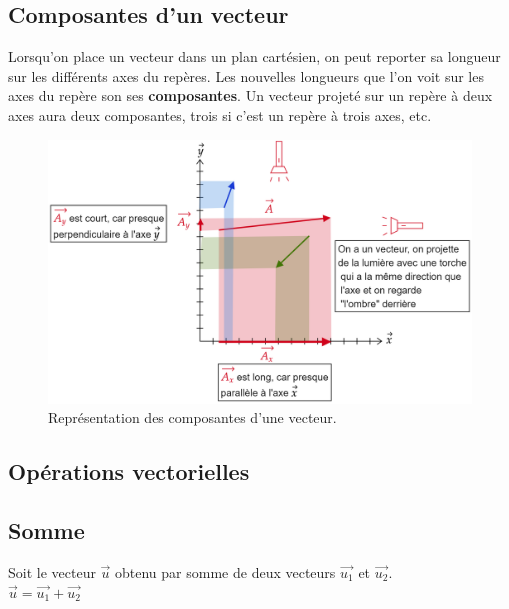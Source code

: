 \documentclass[
	11pt, %
	fleqn, %
	a4paper, %
]{LegrandOrangeBook}
\begin{document}
\subsection{Composantes d'un vecteur}


\begin{theorem}
Lorsqu’on place un vecteur dans un plan cartésien, on peut reporter sa longueur sur les différents axes du repères. Les nouvelles longueurs que l'on voit sur les axes du repère son ses \textbf{composantes}. Un vecteur projeté sur un repère à deux axes aura deux composantes, trois si c'est un repère à trois axes, etc.
\end{theorem}

\begin{figure}[H] %
	\centering %
	\includegraphics[width=1\textwidth]{Images/compo1.png} %
	\caption{Représentation des composantes d'une vecteur.}
	\label{compo1} %
\end{figure}














\subsection{Opérations vectorielles}
\subsection*{Somme}
Soit le vecteur $\Vec{u}$ obtenu par somme de deux vecteurs $\Vec{u_1}$ et $\Vec{u_2}$. \\
$\Vec{u} = \Vec{u_1} + \Vec{u_2}$
\end{document}
